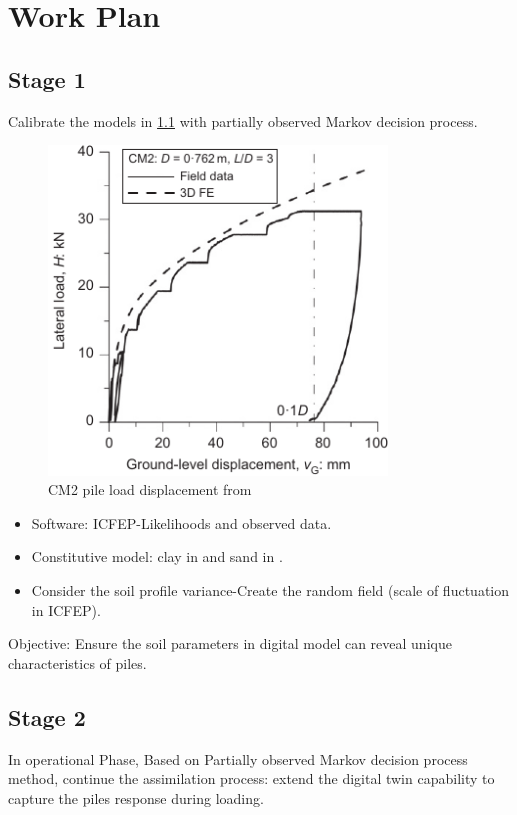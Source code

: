 \chapter{Work Plan}

\label{Work_Plan}




\section{Stage 1}
Calibrate the models in \cref{fig: CM2pile} with partially observed Markov decision process.
\begin{figure}[H]
    \centering

    \includegraphics[width = 90mm]{Figures/figure-CM2.pdf}
    \caption{CM2 pile load displacement from \protect\cite{zdravkovic2020}}
    \label{fig: CM2pile}
\end{figure}

\begin{itemize}
    \item Software: ICFEP-Likelihoods and observed data.
    \item Constitutive model: clay in \cite{zdravkovic2020} and sand in \cite{taborda2020}.
    \item Consider the soil profile variance-Create the random field (scale of fluctuation in ICFEP).
\end{itemize}
Objective: Ensure the soil parameters in digital model can reveal unique characteristics of piles.

\section{Stage 2}
In operational Phase, Based on Partially observed Markov decision process method, continue the assimilation process: extend the digital twin capability to capture the piles response during loading.

